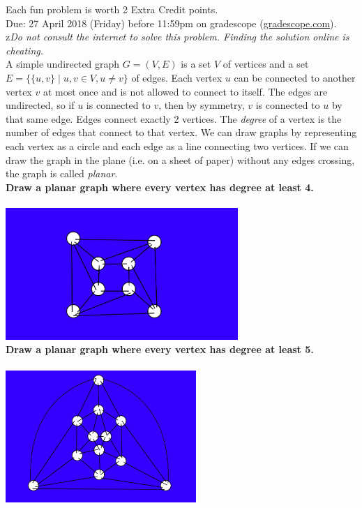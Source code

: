 \documentclass{article}
\theoremstyle{definition}
\begin{document}
\noindent
Each fun problem is worth 2 Extra Credit points.\\
Due: 27 April 2018 (Friday) before 11:59pm on gradescope (\url{gradescope.com}).\\
z\textit{Do not consult the internet to solve this problem.  Finding the solution online is cheating.}\\

\noindent
A simple undirected graph $G=(V,E)$ is a set $V$ of vertices and a set $E=\{\{u,v\} \mid u,v \in V, u \neq v\}$ of edges.   Each vertex $u$ can be connected to another vertex $v$ at most once and is not allowed to connect to itself.  The edges are undirected, so if $u$ is connected to $v$, then by symmetry, $v$ is connected to $u$ by that same edge. Edges connect exactly 2 vertices.  The \textit{degree} of a vertex is the number of edges that connect to that vertex.  We can draw graphs by representing each vertex as a circle and each edge as a line connecting two vertices.  If we can draw the graph in the plane (i.e. on a sheet of paper) without any edges crossing, the graph is called \textit{planar}.
\ \\
\noindent
\textbf{Draw a planar graph where every vertex has degree at least 4.}\ \\
\ \\
\includegraphics[height = 5cm]{funproblem13.png}
\ \\
\noindent
\textbf{Draw a planar graph where every vertex has degree at least 5.}\ \\
\ \\
\includegraphics[height = 5cm]{funproblem13-2.png}
\ \\
\vfill
\end{document}
